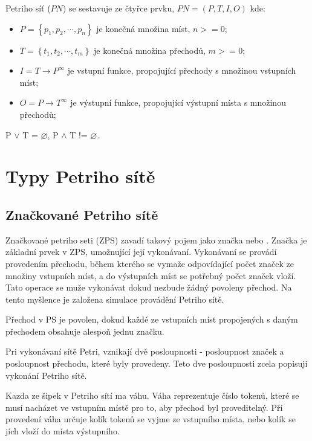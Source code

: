 Petriho síť ($PN$) se sestavuje ze čtyřce prvku, $PN = \left(P, T, I, O\right)$ kde:
  \begin{itemize}
    \item $P = \left\{p_1, p_2, \cdots , p_n\right\}$ je konečná množina míst, $n >= 0$; \\
    \item $T = \left\{t_1, t_2, \cdots , t_m\right\}$ je konečná množina přechodů, $m >= 0$; \\
    \item $I = T \rightarrow P^\infty$ je vstupní funkce, propojující přechody s množinou vstupních míst; \\
    \item $O = P \rightarrow T^\infty$ je výstupní funkce, propojující výstupní místa s množinou přechodů; \\
  \end{itemize}
P $\vee$ T = $\varnothing$, P $\wedge$ T != $\varnothing$.

\section{Typy Petriho sítě}

\subsection{Značkované Petriho sítě}
Značkované petriho seti (ZPS) zavadí takový pojem jako značka nebo . Značka je základní prvek v ZPS, umožnující její vykonávaní. Vykonávaní se provádí provedením přechodu, během kterého se vymaže odpovídající počet značek ze množiny vstupních míst, a do výstupních míst se potřebný počet značek vloží. Tato operace se muže vykonávat dokud nezbude žádný povoleny přechod. Na tento myšlence je založena simulace provádění Petriho sítě.

Přechod v PS je povolen, dokud každé ze vstupních míst propojených s daným přechodem obsahuje alespoň jednu značku.

Pri vykonávaní sítě Petri, vznikají dvě posloupnosti - posloupnost značek a posloupnost přechodu, které byly provedeny. Teto dve posloupnosti zcela popisuji vykonání Petriho sítě.

Kazda ze šipek v Petriho sítí ma váhu. Váha reprezentuje číslo tokenů, které se musí nacházet ve vstupním místě pro to, aby přechod byl proveditelný. Pří provedení váha určuje kolík tokenů se vyjme ze vstupního místa, nebo kolík se jích vloží do místa výstupního.

